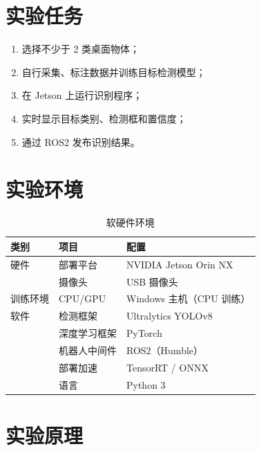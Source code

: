 \documentclass[zihao=-4, a4paper]{ctexart}
\newcommand{\tabhead}[1]{\textbf{\color{white}#1}}
\begin{document}
\section{实验任务}
\begin{notebox}[实验任务]
    \begin{enumerate}[label=\arabic*., leftmargin=2em]
        \item 选择不少于 2 类桌面物体；
        \item 自行采集、标注数据并训练目标检测模型；
        \item 在 Jetson 上运行识别程序；
        \item 实时显示目标类别、检测框和置信度；
        \item 通过 ROS2 发布识别结果。
    \end{enumerate}
\end{notebox}

\section{实验环境}
\begin{table}[H]
    \centering
    \begin{tabular}{@{}lll@{}}
        \hline
        \rowcolor{primary}
        \tabhead{类别} & \tabhead{项目} & \tabhead{配置} \\
        \hline
        硬件 & 部署平台 & NVIDIA Jetson Orin NX \\
             & 摄像头 & USB 摄像头 \\
        训练环境 & CPU/GPU & Windows 主机（CPU 训练） \\
        软件 & 检测框架 & Ultralytics YOLOv8 \\
             & 深度学习框架 & PyTorch \\
             & 机器人中间件 & ROS2（Humble） \\
             & 部署加速 & TensorRT / ONNX \\
             & 语言 & Python 3 \\
        \hline
    \end{tabular}
    \caption{软硬件环境}
\end{table}

\section{实验原理}
\end{document}
